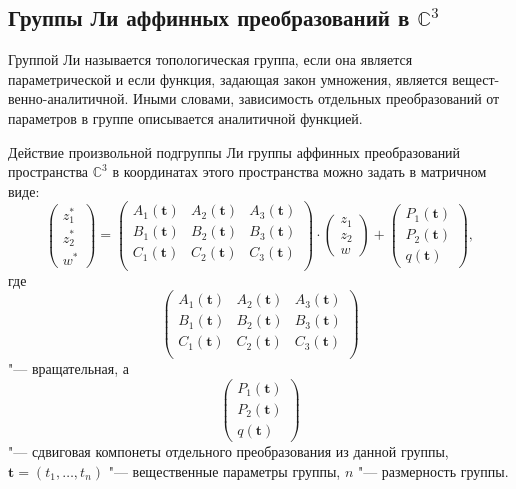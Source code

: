 \documentclass[../main.tex]{subfiles}
\begin{document}
\subsection{Группы Ли аффинных преобразований в $\mathbb{C}^3$}
Группой Ли называется топологическая группа, если она является параметрической и если функция, задающая закон умножения, является {вещест-}{венно-аналитичной}. Иными словами, зависимость отдельных преобразований от параметров в группе описывается аналитичной функцией.

Действие произвольной подгруппы Ли группы аффинных преобразований пространства $\mathbb{C}^3$ в координатах этого пространства можно задать в матричном виде:
\begin{equation}\label{eq:affine_transform}
\begin{pmatrix}
z_1^* \\
z_2^* \\
w^*
\end{pmatrix} = 
\begin{pmatrix}
A_1(\mathbf t) & A_2(\mathbf t) & A_3(\mathbf t) \\
B_1(\mathbf t) & B_2(\mathbf t) & B_3(\mathbf t) \\
C_1(\mathbf t) & C_2(\mathbf t) & C_3(\mathbf t) \\
\end{pmatrix}
\cdot
\begin{pmatrix}
z_1 \\
z_2 \\
w
\end{pmatrix}
+
\begin{pmatrix}
P_1(\mathbf t) \\
P_2(\mathbf t) \\
q(\mathbf t)
\end{pmatrix},
\end{equation}
где
\begin{equation*}
\begin{pmatrix}
A_1(\mathbf t) & A_2(\mathbf t) & A_3(\mathbf t) \\
B_1(\mathbf t) & B_2(\mathbf t) & B_3(\mathbf t) \\
C_1(\mathbf t) & C_2(\mathbf t) & C_3(\mathbf t) \\
\end{pmatrix}
\end{equation*}
"--- вращательная, а
\begin{equation*}
\begin{pmatrix}
P_1(\mathbf t) \\
P_2(\mathbf t) \\
q(\mathbf t)
\end{pmatrix}
\end{equation*}
"--- сдвиговая компонеты отдельного преобразования из данной группы, $\mathbf t = (t_1, \hdots, t_n)$ "--- вещественные параметры группы, $n$ "--- размерность группы.
\end{document}

